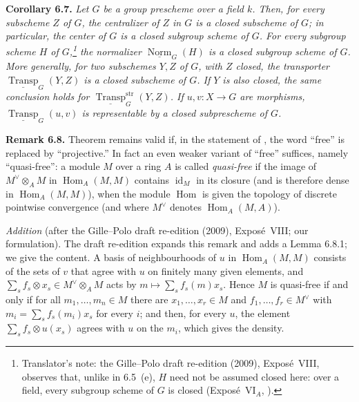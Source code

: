 \medskip
\noindent{}\textbf{Corollary 6.7.}
\textit{Let \(G\) be a group prescheme over a field \(k\). Then, for every
subscheme \(Z\) of \(G\), the centralizer of \(Z\) in \(G\) is a closed
subscheme of \(G\); in particular, the center of \(G\) is a closed subgroup
scheme of \(G\). For every subgroup scheme \(H\) of \(G\),\footnote{Translator's note: the
Gille--Polo draft re-edition (2009), Expos\'e~VIII, observes that, unlike in 6.5~(e), \(H\) need not
be assumed closed here: over a field, every subgroup scheme of \(G\) is closed (Expos\'e~VI\(_A\),
).} the normalizer
\(\underline{\operatorname{Norm}}_G(H)\) is a closed subgroup scheme of
\(G\). More generally, for two subschemes \(Y,Z\) of \(G\), with \(Z\)
closed, the transporter \(\underline{\operatorname{Transp}}_G(Y,Z)\) is a
closed subscheme of \(G\). If \(Y\) is also closed, the same conclusion
holds for \(\underline{\operatorname{Transp}}^{\mathrm{str}}_G(Y,Z)\). If
\(u,v:X\to G\) are morphisms,
\(\underline{\operatorname{Transp}}_G(u,v)\) is representable by a closed
subprescheme of \(G\).}

\medskip
\noindent{}\textbf{Remark 6.8.}
Theorem  remains valid if, in the
statement of , the word
``free'' is replaced by ``projective.'' In fact an even weaker variant of
``free'' suffices, namely ``quasi-free'': a module \(M\) over a ring \(A\)
is called \emph{quasi-free} if the image of \(M^\vee\otimes_AM\) in
\(\operatorname{Hom}_A(M,M)\) contains \(\operatorname{id}_M\) in its closure
(and is therefore dense in \(\operatorname{Hom}_A(M,M)\)), when the module
\(\operatorname{Hom}\) is given the topology of discrete pointwise
convergence (and where \(M^\vee\) denotes \(\operatorname{Hom}_A(M,A)\)).

\emph{Addition} (after the Gille--Polo draft re-edition (2009), Expos\'e~VIII; our formulation).
The draft re-edition expands this remark and adds a Lemma 6.8.1; we give the content. A basis of
neighbourhoods of \(u\) in \(\operatorname{Hom}_A(M,M)\) consists of the sets of \(v\) that agree
with \(u\) on finitely many given elements, and \(\sum_sf_s\otimes x_s\in M^\vee\otimes_AM\) acts by
\(m\mapsto\sum_sf_s(m)x_s\). Hence \(M\) is quasi-free if and only if for all
\(m_1,\ldots,m_n\in M\) there are \(x_1,\ldots,x_r\in M\) and \(f_1,\ldots,f_r\in M^\vee\) with
\(m_i=\sum_sf_s(m_i)x_s\) for every \(i\); and then, for every \(u\), the element
\(\sum_sf_s\otimes u(x_s)\) agrees with \(u\) on the \(m_i\), which gives the density.

